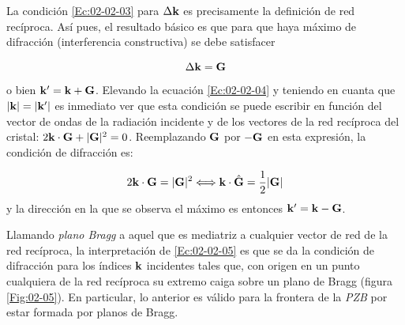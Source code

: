 La condición \ref{Ec:02-02-03} para $\Delta \mathbf{k}$ es precisamente la definición de red recíproca. Así pues, el resultado básico es que para que haya máximo de difracción (interferencia constructiva) se debe satisfacer 


\begin{equation}
    \Delta \mathbf{k} = \mathbf{G}\label{Ec:02-02-04}
\end{equation}
o bien $\mathbf{k}'=\mathbf{k}+\mathbf{G}$. Elevando la ecuación \ref{Ec:02-02-04} y teniendo en cuanta que $|\mathbf{k}|=|\mathbf{k}'|$ es inmediato ver que esta condición se puede escribir en función del vector de ondas de la radiación incidente y de los vectores de la red recíproca del cristal: $2\mathbf{k} \cdot \mathbf{G} + |\mathbf{G}|^2 = 0$. Reemplazando $\mathbf{G}$ por $-\mathbf{G}$ en esta expresión, la condición de difracción es: 

\begin{equation}
    2 \mathbf{k} \cdot \mathbf{G} = |\mathbf{G}|^2 \Longleftrightarrow \mathbf{k} \cdot \hat{\mathbf{G}} = \frac{1}{2} |\mathbf{G}| \label{Ec:02-02-05}
\end{equation}
y la dirección en la que se observa el máximo es entonces $\mathbf{k}'=\mathbf{k}-\mathbf{G}$. 



Llamando \textit{plano Bragg} a aquel que es mediatriz a cualquier vector de red de la red recíproca, la interpretación de \ref{Ec:02-02-05} es que se da la condición de difracción para los índices $\mathbf{k}$ incidentes tales que, con origen en un punto cualquiera de la red recíproca su extremo caiga sobre un plano de Bragg (figura \ref{Fig:02-05}). En particular, lo anterior es válido para la frontera de la \textit{PZB} por estar formada por planos de Bragg. 

